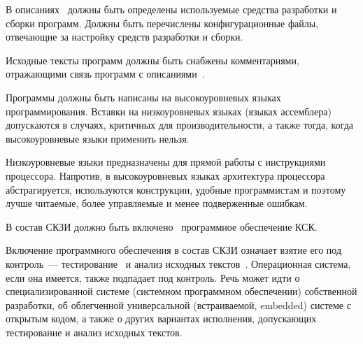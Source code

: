 \label{R.DI.Tools} %
В описаниях~ должны быть определены используемые средства
разработки и сборки программ. Должны быть перечислены конфигурационные файлы,
отвечающие за настройку средств разработки и сборки.

\label{R.DI.Comments} %
Исходные тексты программ должны быть снабжены комментариями,
отражающими связь программ с описаниями~.

\label{R.DI.Language} %
Программы должны быть написаны на высокоуровневых языках программирования.
Вставки на низкоуровневых языках (языках ассемблера) допускаются в случаях,
критичных для производительности, а также тогда, когда высокоуровневые языки
применить нельзя.

\begin{note}
Низкоуровневые языки предназначены для прямой работы с инструкциями процессора. 
Напротив, в высокоуровневых языках архитектура процессора абстрагируется, 
используются конструкции, удобные программистам и поэтому  
лучше читаемые, более управляемые и менее подверженные ошибкам.
\end{note}

\label{R.DI.OS} %
В состав СКЗИ должно быть включено~ программное 
обеспечение КСК.

\begin{note}
Включение программного обеспечения в состав СКЗИ означает 
взятие его под контроль~--- тестирование~
и анализ исходных текстов~. 
%
Операционная система, если она имеется, также подпадает под контроль. 
%
Речь может идти о специализированной системе (системном программном обеспечении) 
собственной разработки, об облегченной универсальной (встраиваемой, 
embedded) системе с открытым кодом, а также о других вариантах исполнения,
допускающих тестирование и анализ исходных текстов.
\end{note}

